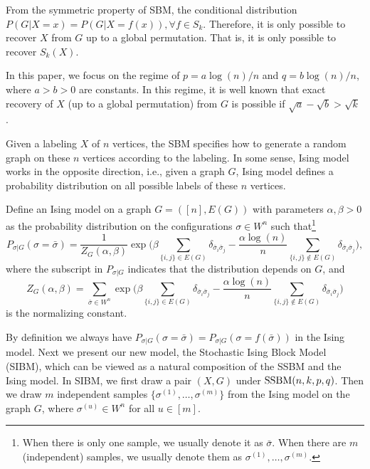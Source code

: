 \documentclass{article}
\begin{document}
	From the symmetric property of SBM, the conditional distribution $P(G|X=x) = P(G|X=f(x)), \forall f \in S_k$. Therefore, it is only possible to recover $X$ from $G$ up to a global permutation. That is, it is only possible to recover $S_k(X)$.

In this paper, we focus on the regime of $p=a\log(n)/n$ and $q=b\log(n)/n$, where $a>b> 0$ are constants. In this regime, it is well known that exact recovery of $X$ (up to a global permutation) from $G$ is possible if $\sqrt{a}-\sqrt{b} > \sqrt{k}$ \cite{abbe2015community}.

Given a labeling $X$ of $n$ vertices, the SBM specifies how to generate a random graph on these $n$ vertices according to the labeling. In some sense, Ising model works in the opposite direction, i.e., given a graph $G$, Ising model defines a probability distribution on all possible labels of these $n$ vertices. 

 \begin{definition}
Define an Ising model on a graph $G=([n],E(G))$ with parameters $\alpha,\beta>0$ as the probability distribution on the configurations $\sigma\in W^n$ such that\footnote{When there is only one sample, we usually denote it as $\bar{\sigma}$. When there are $m$ (independent) samples, we usually denote them as $\sigma^{(1)},\dots,\sigma^{(m)}$.}
\begin{equation} \label{eq:isingma}
P_{\sigma|G}(\sigma=\bar{\sigma})=\frac{1}{Z_G(\alpha,\beta)}
\exp\Big(\beta\sum_{\{i,j\}\in E(G)} \delta_{\bar{\sigma}_i \bar{\sigma}_j}
-\frac{\alpha\log(n)}{n} \sum_{\{i,j\}\notin E(G)} \delta_{\bar{\sigma}_i \bar{\sigma}_j} \Big),
\end{equation}
where the subscript in $P_{\sigma|G}$ indicates that the distribution depends on $G$, and 
\begin{equation}  \label{eq:zg}
Z_G(\alpha,\beta)=\sum_{\bar{\sigma} \in W^n} \exp\Big(\beta\sum_{\{i,j\}\in E(G)}\delta_{\bar{\sigma}_i \bar{\sigma}_j} 
-\frac{\alpha\log(n)}{n} \sum_{\{i,j\}\notin E(G)} \delta_{\bar{\sigma}_i \bar{\sigma}_j}  \Big) 
\end{equation}
is the normalizing constant.
\end{definition}






By definition we always have $P_{\sigma|G}(\sigma=\bar{\sigma})=P_{\sigma|G}(\sigma=f(\bar{\sigma}))$ in the Ising model. Next we present our new model, the Stochastic Ising Block Model (SIBM), which can be viewed as a natural composition of the SSBM and the Ising model. In SIBM, we first draw a pair $(X,G)$ under $\operatorname{SSBM}(n,k, p,q)$.  Then we draw $m$ independent samples $\{\sigma^{(1)},\dots,\sigma^{(m)}\}$ from the Ising model on the graph $G$, where $\sigma^{(u)}\in W^n$ for all $u\in[m]$.
\end{document}
